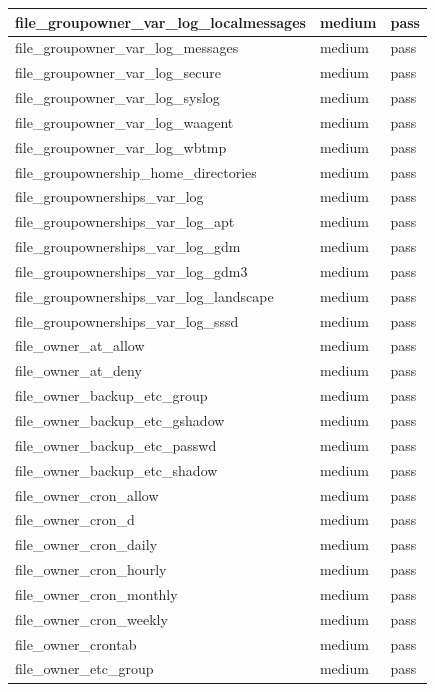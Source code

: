 \begin{longtable}{|p{10cm}|p{2cm}|p{2cm}|}
\hline
file\_groupowner\_var\_log\_localmessages & medium & pass \\
\hline
file\_groupowner\_var\_log\_messages & medium & pass \\
\hline
file\_groupowner\_var\_log\_secure & medium & pass \\
\hline
file\_groupowner\_var\_log\_syslog & medium & pass \\
\hline
file\_groupowner\_var\_log\_waagent & medium & pass \\
\hline
file\_groupowner\_var\_log\_wbtmp & medium & pass \\
\hline
file\_groupownership\_home\_directories & medium & pass \\
\hline
file\_groupownerships\_var\_log & medium & pass \\
\hline
file\_groupownerships\_var\_log\_apt & medium & pass \\
\hline
file\_groupownerships\_var\_log\_gdm & medium & pass \\
\hline
file\_groupownerships\_var\_log\_gdm3 & medium & pass \\
\hline
file\_groupownerships\_var\_log\_landscape & medium & pass \\
\hline
file\_groupownerships\_var\_log\_sssd & medium & pass \\
\hline
file\_owner\_at\_allow & medium & pass \\
\hline
file\_owner\_at\_deny & medium & pass \\
\hline
file\_owner\_backup\_etc\_group & medium & pass \\
\hline
file\_owner\_backup\_etc\_gshadow & medium & pass \\
\hline
file\_owner\_backup\_etc\_passwd & medium & pass \\
\hline
file\_owner\_backup\_etc\_shadow & medium & pass \\
\hline
file\_owner\_cron\_allow & medium & pass \\
\hline
file\_owner\_cron\_d & medium & pass \\
\hline
file\_owner\_cron\_daily & medium & pass \\
\hline
file\_owner\_cron\_hourly & medium & pass \\
\hline
file\_owner\_cron\_monthly & medium & pass \\
\hline
file\_owner\_cron\_weekly & medium & pass \\
\hline
file\_owner\_crontab & medium & pass \\
\hline
file\_owner\_etc\_group & medium & pass \\

\end{longtable}
